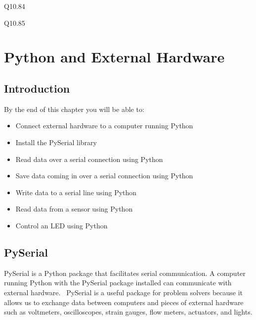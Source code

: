 \documentclass{book}
\begin{document}
Q10.84

Q10.85
    




    
        \chapter{Python and External
Hardware}\label{python-and-external-hardware}
    




    
        \section{Introduction}\label{introduction}
    




    
        By the end of this chapter you will be able to:

\begin{itemize}
\item
  Connect external hardware to a computer running Python
\item
  Install the PySerial library
\item
  Read data over a serial connection using Python
\item
  Save data coming in over a serial connection using Python
\item
  Write data to a serial line using Python
\item
  Read data from a sensor using Python
\item
  Control an LED using Python
\end{itemize}
        \newpage



    




    
        \section{PySerial}\label{pyserial}
    




    
        PySerial is a Python package that facilitates serial communication. A
computer running Python with the PySerial package installed can
communicate with external hardware. ~PySerial is a useful package for
problem solvers because it allows us to exchange data between computers
and pieces of external hardware such as voltmeters, oscilloscopes,
strain gauges, flow meters, actuators, and lights.
\end{document}
